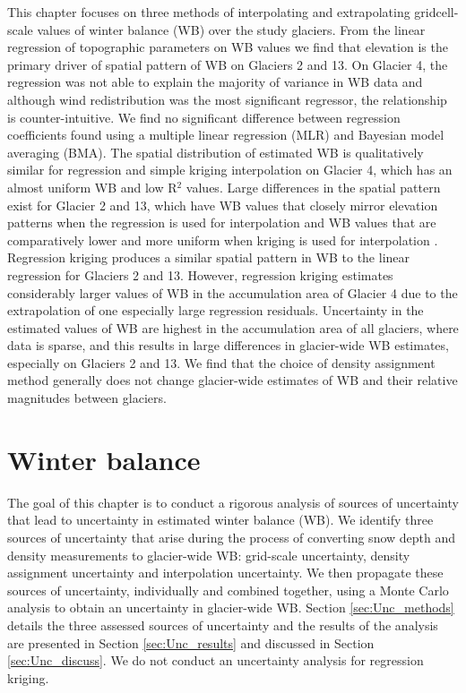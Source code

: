 \documentclass{sfuthesis}
\begin{document}
This chapter focuses on three methods of interpolating and extrapolating gridcell-scale values of winter balance (WB) over the study glaciers. From the linear regression of topographic parameters on WB values we find that elevation is the primary driver of spatial pattern of WB on Glaciers 2 and 13. On Glacier 4, the regression was not able to explain the majority of variance in WB data and although wind redistribution was the most significant regressor, the relationship is counter-intuitive. We find no significant difference between regression coefficients found using a multiple linear regression (MLR) and Bayesian model averaging (BMA). The spatial distribution of estimated WB is qualitatively similar for regression and simple kriging interpolation on Glacier 4, which has an almost uniform WB and low R$^2$ values. Large differences in the spatial pattern exist for Glacier 2 and 13, which have WB values that closely mirror elevation patterns when the regression is used for interpolation and WB values that are comparatively lower and more uniform when kriging is used for interpolation . Regression kriging produces a similar spatial pattern in WB to the linear regression for Glaciers 2 and 13. However, regression kriging estimates considerably larger values of WB in the accumulation area of Glacier 4 due to the extrapolation of one especially large regression residuals. Uncertainty in the estimated values of WB are highest in the accumulation area of all glaciers, where data is sparse, and this results in large differences in glacier-wide WB estimates, especially on Glaciers 2 and 13. We find that the choice of density assignment method generally does not change glacier-wide estimates of WB and their relative magnitudes between glaciers.




\chapter{Winter balance }
\label{sec:WinterBalance}

The goal of this chapter is to conduct a rigorous analysis of sources of uncertainty that lead to uncertainty in estimated winter balance (WB). We identify three sources of uncertainty that arise during the process of converting snow depth and density measurements to glacier-wide WB: grid-scale uncertainty, density assignment uncertainty and interpolation uncertainty. We then propagate these sources of uncertainty, individually and combined together, using a Monte Carlo analysis to obtain an uncertainty in glacier-wide WB. Section \ref{sec:Unc_methods} details the three assessed sources of uncertainty and the results of the analysis are presented in Section \ref{sec:Unc_results} and discussed in Section \ref{sec:Unc_discuss}. We do not conduct an uncertainty analysis for regression kriging. 
\end{document}
